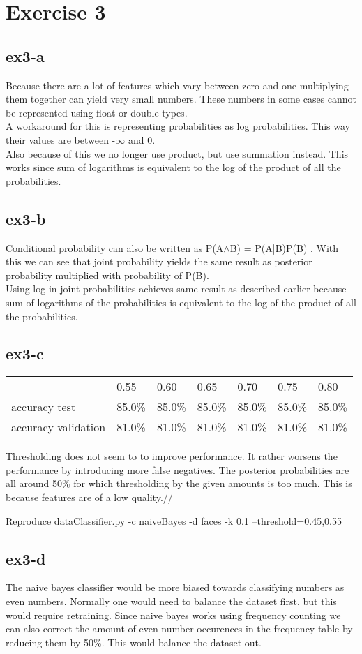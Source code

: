 \section{Exercise 3}
\subsection{ex3-a}
Because there are a lot of features which vary between zero and one multiplying them together can yield very small
numbers. These numbers in some cases cannot be represented using float or double types.\\
A workaround for this is representing probabilities as log probabilities. This way their values are between -$\infty$ and 0.\\
Also because of this we no longer use product, but use summation instead. This works since sum of logarithms is
equivalent to the log of the product of all the probabilities.

\subsection{ex3-b}
Conditional probability can also be written as P(A$\wedge$B) = P(A|B)P(B) . With this we can see that joint probability yields
the same result as posterior probability multiplied with probability of P(B). \\
Using log in joint probabilities achieves same result as described earlier because sum of logarithms of the
probabilities is equivalent to the log of the product of all the probabilities.

\subsection{ex3-c}
\begin{table}[!htbp]
\centering
\begin{tabular}{l|llllll}
                    & 0.55   & 0.60   & 0.65   & 0.70   & 0.75   & 0.80   \\ \cline{2-7}
accuracy test       & 85.0\% & 85.0\% & 85.0\% & 85.0\% & 85.0\% & 85.0\% \\ \cline{2-7}
accuracy validation & 81.0\% & 81.0\% & 81.0\% & 81.0\% & 81.0\% & 81.0\%
\end{tabular}
\end{table}
Thresholding does not seem to to improve performance. It rather worsens the performance by introducing more false
negatives. The posterior probabilities are all around 50\% for which thresholding by the given amounts is too much. This
is because features are of a low quality.//

Reproduce dataClassifier.py -c naiveBayes -d faces -k 0.1 --threshold=0.45,0.55

\subsection{ex3-d}
The naive bayes classifier would be more biased towards classifying numbers as even numbers. Normally one would need to
balance the dataset first, but this would require retraining. Since naive bayes works using frequency counting we can
also correct the amount of even number occurences in the frequency table by reducing them by 50\%. This would balance the
dataset out.